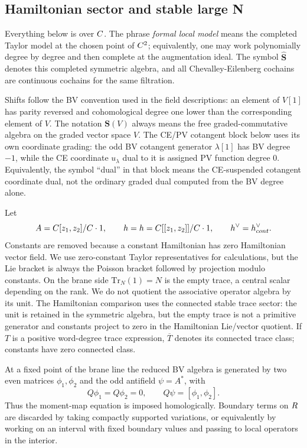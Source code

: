 \documentclass[11pt]{memoir}
\begin{document}
\subsection{Hamiltonian sector and stable large N}

Everything below is over $C$. The phrase \emph{formal local model} means
the completed Taylor model at the chosen point of $C^2$; equivalently, one
may work polynomially degree by degree and then complete at the
augmentation ideal. The symbol $\widehat{\mathbf S}$ denotes this completed
symmetric algebra, and all Chevalley-Eilenberg cochains are continuous
cochains for the same filtration.

Shifts follow the BV convention used in the field descriptions: an element
of $V[1]$ has parity reversed and cohomological degree one lower than the
corresponding element of $V$. The notation $\mathbf S(V)$ always means the
free graded-commutative algebra on the graded vector space $V$.
The CE/PV cotangent block below uses its own coordinate grading: the
odd BV cotangent generator $\lambda[1]$ has BV degree $-1$, while the
CE coordinate $u_\lambda$ dual to it is assigned PV function degree
$0$. Equivalently, the symbol ``dual'' in that block means the
CE-suspended cotangent coordinate dual, not the ordinary graded dual
computed from the BV degree alone.

Let
$$A=C[z_1,z_2]/C\cdot1,\qquad
  h=h=C[[z_1,z_2]]/C\cdot1,\qquad
  h^\vee=h^{\vee}_{cont}.$$
Constants are removed because a constant Hamiltonian has zero Hamiltonian
vector field. We use zero-constant Taylor representatives for calculations,
but the Lie bracket is always the Poisson bracket followed by projection
modulo constants. On the brane side $\mathrm{Tr}_N(1)=N$ is the empty
trace, a central scalar depending on the rank. We do not quotient the
associative operator algebra by its unit. The Hamiltonian comparison uses
the connected stable trace sector: the unit is retained in the symmetric
algebra, but the empty trace is not a primitive generator and constants
project to zero in the Hamiltonian Lie/vector quotient. If $T$ is a
positive word-degree trace expression, $\overline T$ denotes its connected
trace class; constants have zero connected class.

At a fixed point of the brane line the reduced BV algebra is generated by
two even matrices $\phi_1,\phi_2$ and the odd antifield $\psi=A^*$, with
$$Q\phi_1=Q\phi_2=0,\qquad Q\psi=[\phi_1,\phi_2].$$
Thus the moment-map equation is imposed homologically. Boundary terms on
$R$ are discarded by taking compactly supported variations, or
equivalently by working on an interval with fixed boundary values and
passing to local operators in the interior.
\end{document}

